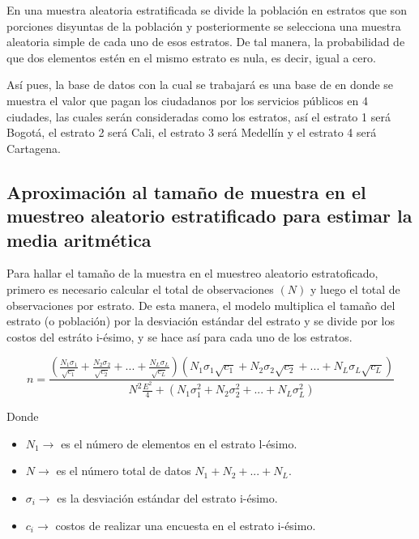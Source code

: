 \documentclass[10pt]{article}
\begin{document}
        En una muestra aleatoria estratificada se divide la población en estratos que son porciones disyuntas de la población y posteriormente se selecciona una muestra aleatoria simple de cada uno de esos estratos. De tal manera, la probabilidad de que dos elementos estén en el mismo estrato es nula, es decir, igual a cero. 

        Así pues, la base de datos con la cual se trabajará es una base de en donde se muestra el valor que pagan los ciudadanos por los servicios públicos en 4 ciudades, las cuales serán consideradas como los estratos, así el estrato 1 será Bogotá, el estrato 2 será Cali, el estrato 3 será Medellín y el estrato 4 será Cartagena. 
                   
        \subsection*{Aproximación al tamaño de muestra en el muestreo aleatorio estratificado para estimar la media aritmética}

        Para hallar el tamaño de la muestra en el muestreo aleatorio estratoficado, primero es necesario calcular el total de observaciones $(N)$ y luego el total de observaciones por estrato. De esta manera, el modelo multiplica el tamaño del estrato (o población) por la desviación estándar del estrato y se divide por los costos del estráto i-ésimo, y se hace así para cada uno de los estratos. 

        $$
        n=\frac{  \left ( \frac{N_1\sigma _1}{\sqrt{c_1}} + \frac{N_2\sigma _2}{\sqrt{c_2}}+...+\frac{N_L\sigma _L}{\sqrt{c_L}}\right )\left ( N_1 \sigma _1 \sqrt{c_1}+N_2 \sigma _2 \sqrt{c_2}+...+N_L \sigma _L \sqrt{c_L}\right )}{N^2\frac{E^2}{4}+\left ( N_1 \sigma^2 _1 +N_2 \sigma^2 _2 +...+N_L \sigma^2 _L \right )}
        $$

        Donde 

        \begin{itemize}
            \item $N_1 \to$ es el número de elementos en el estrato l-ésimo.
            \item $N \to$ es el número total de datos $N_1+N_2+...+N_L$.
            \item $\sigma_i \to$ es la desviación estándar del estrato i-ésimo.
            \item $c_i \to$ costos de realizar una encuesta en el estrato i-ésimo.
        \end{itemize}
\end{document}
